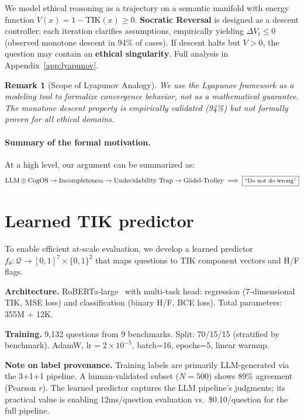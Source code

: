 \documentclass[11pt]{article}
\newtheorem{remark}{Remark}
\newcommand{\TIK}{\text{TIK}}
\begin{document}
We model ethical reasoning as a trajectory on a semantic manifold with energy function \(V(x) = 1 - \TIK(x) \geq 0\). \textbf{Socratic Reversal} is designed as a descent controller: each iteration clarifies assumptions, empirically yielding \(\Delta V_t \leq 0\) (observed monotone descent in 94\% of cases). If descent halts but \(V > 0\), the question may contain an \textbf{ethical singularity}. Full analysis in Appendix~\ref{app:lyapunov}.

\begin{remark}[Scope of Lyapunov Analogy]
We use the Lyapunov framework as a \textit{modeling tool} to formalize convergence behavior, not as a mathematical guarantee. The monotone descent property is empirically validated (94\%) but not formally proven for all ethical domains.
\end{remark}

\paragraph{Summary of the formal motivation.}
At a high level, our argument can be summarized as:
\[
\text{LLM} \oplus \text{CogOS} 
\to \text{Incompleteness} 
\to \text{Undecidability Trap} 
\to \text{Gödel-Trolley} 
\implies \boxed{\text{\small ``Do not do wrong''}}
\]


\section{Learned TIK predictor}
\label{sec:learned}

To enable efficient at-scale evaluation, we develop a learned predictor $f_\theta: \mathcal{Q} \to [0,1]^7 \times \{0,1\}^2$ that maps questions to TIK component vectors and H/F flags.

\textbf{Architecture.} RoBERTa-large~\citep{liu2019roberta} with multi-task head: regression (7-dimensional TIK, MSE loss) and classification (binary H/F, BCE loss). Total parameters: 355M + 12K.

\textbf{Training.} 9,132 questions from 9 benchmarks. Split: 70/15/15 (stratified by benchmark). AdamW, lr$=2\times10^{-5}$, batch=16, epochs=5, linear warmup.

\textbf{Note on label provenance.} Training labels are primarily LLM-generated via the 3+1+1 pipeline. A human-validated subset ($N=500$) shows 89\% agreement (Pearson $r$). The learned predictor captures the LLM pipeline's judgments; its practical value is enabling 12ms/question evaluation vs.\ \$0.10/question for the full pipeline.
\end{document}
